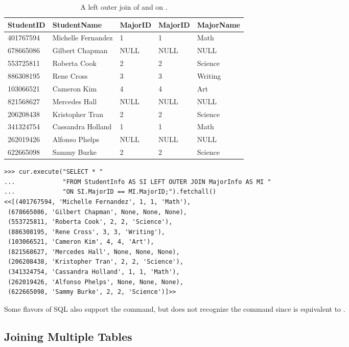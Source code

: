 \begin{table}[H]
\centering
\footnotesize
\begin{tabular}{|l|l|l|l|l|}
    \hline StudentID & StudentName & MajorID & MajorID & MajorName \\ \hline
    401767594 & Michelle Fernandez & 1 & 1 & Math \\
    678665086 & Gilbert Chapman & NULL & NULL & NULL \\
    553725811 & Roberta Cook & 2 & 2 & Science \\
    886308195 & Rene Cross & 3 & 3 & Writing \\
    103066521 & Cameron Kim & 4 & 4 & Art \\
    821568627 & Mercedes Hall & NULL & NULL & NULL \\
    206208438 & Kristopher Tran & 2 & 2 & Science \\
    341324754 & Cassandra Holland & 1 & 1 & Math \\
    262019426 & Alfonso Phelps & NULL & NULL & NULL \\
    622665098 & Sammy Burke & 2 & 2 & Science \\ \hline
\end{tabular}
\caption{A left outer join of  and  on .}
\label{table:sql2-left-outer-join}
\end{table}

\begin{lstlisting}
>>> cur.execute("SELECT * "
...             "FROM StudentInfo AS SI LEFT OUTER JOIN MajorInfo AS MI "
...             "ON SI.MajorID == MI.MajorID;").fetchall()
<<[(401767594, 'Michelle Fernandez', 1, 1, 'Math'),
 (678665086, 'Gilbert Chapman', None, None, None),
 (553725811, 'Roberta Cook', 2, 2, 'Science'),
 (886308195, 'Rene Cross', 3, 3, 'Writing'),
 (103066521, 'Cameron Kim', 4, 4, 'Art'),
 (821568627, 'Mercedes Hall', None, None, None),
 (206208438, 'Kristopher Tran', 2, 2, 'Science'),
 (341324754, 'Cassandra Holland', 1, 1, 'Math'),
 (262019426, 'Alfonso Phelps', None, None, None),
 (622665098, 'Sammy Burke', 2, 2, 'Science')]>>
\end{lstlisting}

Some flavors of SQL also support the  command, but  does not recognize the command since  is equivalent to .

\subsection*{Joining Multiple Tables} %

